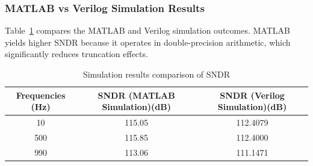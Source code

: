 \documentclass[11pt,onecolumn]{IEEEtran}
\begin{document}
\subsubsection{MATLAB vs Verilog Simulation Results}
Table~\ref{tab:final_sndr_comparison} compares the MATLAB and Verilog simulation outcomes. MATLAB yields higher SNDR because it operates in double-precision arithmetic, which significantly reduces truncation effects.





\vspace{-2mm}
\begin{table}[h!]
\centering
\begin{tabular}{|c|c|c|}
\hline
\textbf{Frequencies (Hz)} & \textbf{SNDR (MATLAB Simulation)(dB)} & \textbf{SNDR (Verilog Simulation)(dB)} \\ \hline
10   &         115.05      & 112.4079 \\ \hline
500  &         115.85      & 112.4000\\ \hline
990  &         113.06      & 111.1471 \\ \hline
\end{tabular}
\caption{Simulation results comparison of SNDR}
\label{tab:final_sndr_comparison}
\end{table} 
\end{document}
